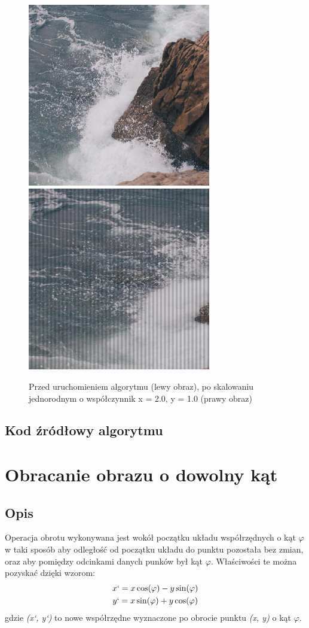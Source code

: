 \documentclass[a4paper,12pt]{book}
\begin{document}
\begin{figure}[H]
	\caption{Przed uruchomieniem algorytmu (lewy obraz), po skalowaniu jednorodnym o współczynnik x = 2.0, y = 1.0 (prawy obraz)}
	\includegraphics[width=8cm, height=8cm]{sea-unmodified.jpg}
	\includegraphics[width=8cm, height=8cm]{4-2/nonuniform-scaling-sea.png}
\end{figure}

\subsection*{Kod źródłowy algorytmu}

\section{Obracanie obrazu o dowolny kąt}
\subsection*{Opis}
Operacja obrotu wykonywana jest wokół początku układu współrzędnych o kąt $\varphi$ w taki sposób aby odległość od początku układu do punktu pozostała bez zmian, oraz aby pomiędzy odcinkami danych punków był kąt $\varphi$. Właściwości te można pozyskać dzięki wzorom: 
\begin{gather}
	x` = x\cos(\varphi) - y\sin(\varphi) \\
	y` = x\sin(\varphi) + y\cos(\varphi)
\end{gather}
gdzie \textit{(x`, y`)} to nowe współrzędne wyznaczone po obrocie punktu \textit{(x, y)} o kąt $\varphi$. 
\end{document}
